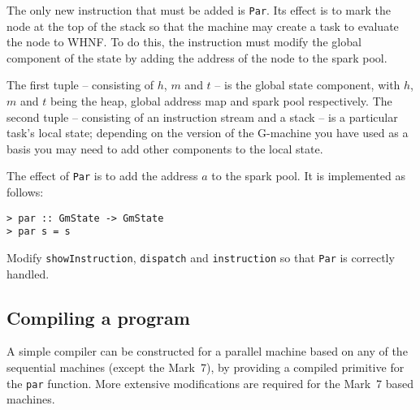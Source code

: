 The only new instruction that must be added is \mbox{\tt Par}. Its
effect is to mark the node at the top of the stack so that the machine
may create a task to evaluate the node to WHNF. To do this, the
instruction must modify the global component of the state by adding
the address of the node to the spark pool.

\pgmrule%
{}%
{}

The first tuple -- consisting of $h$, $m$ and $t$ -- is the global
state component, with $h$, $m$ and $t$ being the heap, global address
map and spark pool respectively. The second tuple -- consisting of an
instruction stream and a stack -- is a particular task's local state;
depending on the version of the G-machine you have used as a basis you
may need to add other components to the local state.

The effect of \mbox{\tt Par} is to add the address $a$ to the spark pool. It is
implemented as follows:
\begin{verbatim}
> par :: GmState -> GmState
> par s = s
\end{verbatim}
%
%
\begin{exercise}\label{pgm:X:par1}
Modify \mbox{\tt showInstruction}, \mbox{\tt dispatch} and \mbox{\tt instruction} so that
\mbox{\tt Par} is correctly handled.
\end{exercise}

\subsection{Compiling a program}

A simple compiler can be constructed for a parallel machine based on
any of the sequential machines (except the Mark~7), by providing a
compiled primitive for the \mbox{\tt par} function. More extensive
modifications are required for the Mark~7 based machines.

